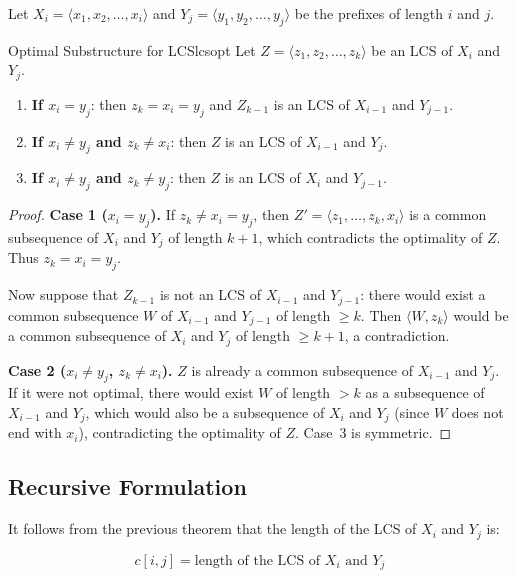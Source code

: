 Let $X_i = \langle x_1, x_2, \ldots, x_i \rangle$ and
$Y_j = \langle y_1, y_2, \ldots, y_j \rangle$ be the prefixes of length $i$ and $j$.

\begin{theorem}{Optimal Substructure for LCS}{lcsopt}
Let $Z = \langle z_1, z_2, \ldots, z_k \rangle$ be an LCS of $X_i$ and $Y_j$.
\begin{enumerate}
  \item \textbf{If $x_i = y_j$}: then $z_k = x_i = y_j$ and $Z_{k-1}$ is an
        LCS of $X_{i-1}$ and $Y_{j-1}$.
  \item \textbf{If $x_i \ne y_j$ and $z_k \ne x_i$}: then $Z$ is an LCS of
        $X_{i-1}$ and $Y_j$.
  \item \textbf{If $x_i \ne y_j$ and $z_k \ne y_j$}: then $Z$ is an LCS of
        $X_i$ and $Y_{j-1}$.
\end{enumerate}
\end{theorem}

\begin{proof}
\textbf{Case 1 ($x_i = y_j$).}
If $z_k \ne x_i = y_j$, then $Z' = \langle z_1, \ldots, z_k, x_i \rangle$ is a
common subsequence of $X_i$ and $Y_j$ of length $k+1$, which contradicts
the optimality of $Z$. Thus $z_k = x_i = y_j$.

Now suppose that $Z_{k-1}$ is not an LCS of $X_{i-1}$ and $Y_{j-1}$:
there would exist a common subsequence $W$ of $X_{i-1}$ and $Y_{j-1}$ of
length $\ge k$. Then $\langle W, z_k \rangle$ would be a common subsequence
of $X_i$ and $Y_j$ of length $\ge k+1$, a contradiction.

\textbf{Case 2 ($x_i \ne y_j$, $z_k \ne x_i$).}
$Z$ is already a common subsequence of $X_{i-1}$ and $Y_j$. If it were not
optimal, there would exist $W$ of length $> k$ as a subsequence of $X_{i-1}$ and $Y_j$,
which would also be a subsequence of $X_i$ and $Y_j$ (since $W$ does not end with $x_i$),
contradicting the optimality of $Z$. Case~3 is symmetric.
\end{proof}

\subsection{Recursive Formulation}

It follows from the previous theorem that the length of the LCS of $X_i$ and $Y_j$ is:

\[
  c[i, j] = \text{length of the LCS of } X_i \text{ and } Y_j
\]

